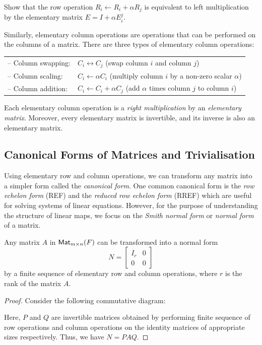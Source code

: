 \begin{exercise}
  Show that the row operation $R_i \leftarrow R_i + \alpha R_j$ is equivalent to left multiplication by the elementary matrix $E = I + \alpha E_i^j$.
\end{exercise}

Similarly, elementary column operations are operations that can be performed on the columns of a matrix. There are three types of elementary column operations:

\begin{tabularx}{\textwidth}{lX}
  -- Column swapping: & $C_i \leftrightarrow C_j$ (swap column $i$ and column $j$)                      \\
  -- Column scaling:  & $C_i \leftarrow \alpha C_i$ (multiply column $i$ by a non-zero scalar $\alpha$) \\
  -- Column addition: & $C_i \leftarrow C_i + \alpha C_j$ (add $\alpha$ times column $j$ to column $i$)
\end{tabularx}

Each elementary column operation is a \emph{right multiplication} by an \emph{elementary matrix}. Moreover, every elementary matrix is invertible, and its inverse is also an elementary matrix.

\subsection{Canonical Forms of Matrices and Trivialisation}

Using elementary row and column operations, we can transform any matrix into a simpler form called the \emph{canonical form}. One common canonical form is the \emph{row echelon form} (REF) and the \emph{reduced row echelon form} (RREF) which are useful for solving systems of linear equations. However, for the purpose of understanding the structure of linear maps, we focus on the \emph{Smith normal form} or \emph{normal form} of a matrix.

\begin{proposition}
  Any matrix $A$ in $\operatorname{\text{\normalfont\sffamily Mat}}_{m \times n}(F)$ can be transformed into a normal form
  \[
    N = \begin{bmatrix}
      I_r & 0 \\
      0   & 0
    \end{bmatrix}
  \]
  by a finite sequence of elementary row and column operations, where $r$ is the rank of the matrix $A$.
\end{proposition}
\begin{proof}
  Consider the following commutative diagram:
  \begin{center}
  \end{center}
  Here, $P$ and $Q$ are invertible matrices obtained by performing finite sequence of row operations and column operations on the identity matrices of appropriate sizes respectively. Thus, we have $N = P A Q$.
\end{proof}

